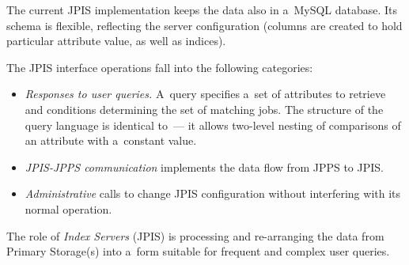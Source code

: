 The current JPIS implementation keeps the data also in a~MySQL database.
Its schema is flexible, reflecting the server configuration
(columns are created to hold particular attribute value, as well as indices).

The JPIS interface operations fall into the following categories:
\begin{itemize}
\item\emph{Responses to user queries.} 
A~query specifies a~set of attributes to retrieve and
conditions determining the set of matching jobs.
The structure of the query language is identical to~\LB---%
it allows two-level nesting of comparisons of an attribute
with a~constant value.

\item\emph{JPIS-JPPS communication} implements the data flow from JPPS to JPIS.

\item\emph{Administrative} calls to change JPIS configuration
without interfering with its normal operation.
\end{itemize}


\iffalse	%

The role of \emph{Index Servers} (JPIS) is processing and re-arranging the data
from Primary Storage(s) into a~form suitable for frequent and complex user
queries.

